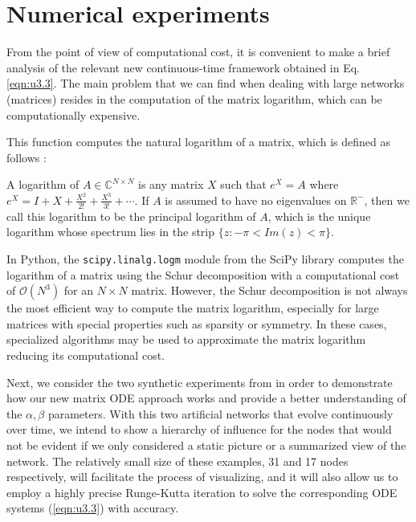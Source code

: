 \chapter{Numerical experiments}
\label{chap:expe}

From the point of view of computational cost, it is convenient to make a brief analysis of the relevant new continuous-time framework obtained in Eq. \ref{eqn:u3.3}. The main problem that we can find when dealing with large networks (matrices) resides in the computation of the matrix logarithm, which can be computationally expensive.

This function computes the natural logarithm of a matrix, which is defined as follows \cite{higham2008functions}:

\begin{definition}
    A logarithm of $A \in \mathbb{C}^{N\times N}$ is any matrix $X$ such that $e^X = A$ where $e^X = I + X + \frac{X^2}{2!} + \frac{X^3}{3!} + \cdots$. If $A$ is assumed to have no eigenvalues on $\mathbb{R}^{-}$, then we call this logarithm to be the principal logarithm of $A$, which is the unique logarithm whose spectrum lies in the strip $\{ z : −\pi < Im(z) < \pi \}$.
\end{definition}

In Python, the \texttt{scipy.linalg.logm} module from the SciPy library computes the logarithm of a matrix using the Schur decomposition with a computational cost of $\mathcal{O}(N^3)$ for an $N \times N$ matrix. However, the Schur decomposition is not always the most efficient way to compute the matrix logarithm, especially for large matrices with special properties such as sparsity or symmetry. In these cases, specialized algorithms may be used to approximate the matrix logarithm reducing its computational cost.

Next, we consider the two synthetic experiments from \cite{grindrod2014dynamical} in order to demonstrate how our new matrix ODE approach works and provide a better understanding of the $\alpha,\beta$ parameters. With this two artificial networks that evolve continuously over time, we intend to show a hierarchy of influence for the nodes that would not be evident if we only considered a static picture or a summarized view of the network. The relatively small size of these examples, 31 and 17 nodes respectively, will facilitate the process of visualizing, and it will also allow us to employ a highly precise Runge-Kutta iteration to solve the corresponding ODE systems (\ref{eqn:u3.3}) with accuracy.

